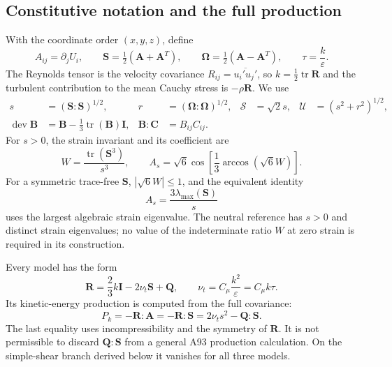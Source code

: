 \documentclass[11pt,a4paper]{article}
\numberwithin{equation}{section}
\newcommand{\eps}{\varepsilon}
\newcommand{\nut}{\nu_t}
\newcommand{\Id}{\boldsymbol I}
\newcommand{\R}{\boldsymbol R}
\newcommand{\Q}{\boldsymbol Q}
\newcommand{\Amat}{\boldsymbol A}
\newcommand{\Smat}{\boldsymbol S}
\newcommand{\Omat}{\boldsymbol\Omega}
\DeclareMathOperator{\dev}{dev}
\DeclareMathOperator{\tr}{tr}
\begin{document}
\subsection{Constitutive notation and the full production}
\label{out:notation}

With the coordinate order $(x,y,z)$, define
\begin{equation}
 A_{ij}=\partial_jU_i,\qquad
 \Smat=\tfrac12(\Amat+\Amat^T),\qquad
 \Omat=\tfrac12(\Amat-\Amat^T),\qquad
 \tau=\frac{k}{\eps}.
 \label{out:gradient}
\end{equation}
The Reynolds tensor is the velocity covariance
$R_{ij}=\overline{u_i'u_j'}$, so $k=\tfrac12\tr\R$ and the turbulent
contribution to the mean Cauchy stress is $-\rho\R$. We use
\begin{align}
 s&=(\Smat:\Smat)^{1/2},&
 r&=(\Omat:\Omat)^{1/2},&
 \mathcal S&=\sqrt2s,&
 \mathcal U&=(s^2+r^2)^{1/2}, \label{out:norms}\\
 \dev\boldsymbol B&=\boldsymbol B-\tfrac13\tr(\boldsymbol B)\Id,
 &\boldsymbol B:\boldsymbol C&=B_{ij}C_{ij}. \nonumber
\end{align}
For $s>0$, the strain invariant and its coefficient are
\begin{equation}
 W=\frac{\tr(\Smat^3)}{s^3},\qquad
 A_s=\sqrt6\cos\left[\frac13\arccos(\sqrt6W)\right].
 \label{out:invariants}
\end{equation}
For a symmetric trace-free $\Smat$, $|\sqrt6W|\le1$, and the equivalent
identity
\begin{equation}
 A_s=\frac{3\lambda_{\max}(\Smat)}s
 \label{out:eigenAs}
\end{equation}
uses the largest algebraic strain eigenvalue. The neutral reference has
$s>0$ and distinct strain eigenvalues; no value of the indeterminate
ratio $W$ at zero strain is required in its construction.

Every model has the form
\begin{equation}
 \boxed{\R=\frac23k\Id-2\nut\Smat+\Q,\qquad
 \nut=C_\mu\frac{k^2}{\eps}=C_\mu k\tau.}
 \label{out:stress}
\end{equation}
Its kinetic-energy production is computed from the full covariance:
\begin{equation}
 P_k=-\R:\Amat=-\R:\Smat
     =2\nut s^2-\Q:\Smat.
 \label{out:production}
\end{equation}
The last equality uses incompressibility and the symmetry of $\R$.
It is not permissible to discard $\Q:\Smat$ from a general A93
production calculation. On the simple-shear branch derived below it
vanishes for all three models.
\end{document}
